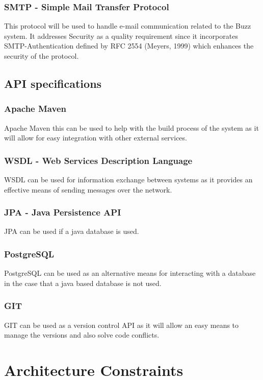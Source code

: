 \documentclass[a4paper,12pt]{report}
\begin{document}
\subsubsection{SMTP - Simple Mail Transfer Protocol}
This protocol will be used to handle e-mail communication related to the Buzz system. It addresses Security as a quality requirement since it incorporates SMTP-Authentication defined by RFC 2554 (Meyers, 1999) which enhances the security of the protocol.

\subsection{API specifications}
\subsubsection{Apache Maven}
Apache Maven this can be used to help with the build process of the system as it will allow for easy integration with other external services.
\subsubsection{WSDL - Web Services Description Language}
WSDL can be used for information exchange between systems as it provides an effective means of sending messages over the network.
\subsubsection{JPA - Java Persistence API}
JPA can be used if a java database is used.
\subsubsection{PostgreSQL}
PostgreSQL can be used as an alternative means for interacting with a database in the case that a java based database is not used.
\subsubsection{GIT}
GIT can be used as a version control API as it will allow an easy means to manage the versions and also solve code conflicts.


\newpage
	\section{Architecture Constraints}
\end{document}
